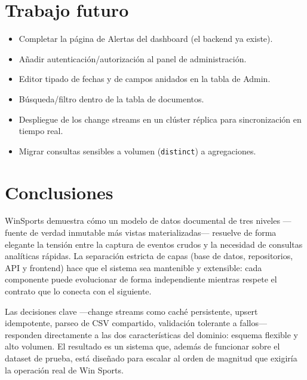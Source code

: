 \documentclass[12pt, letterpaper]{article}
\newcommand{\code}[1]{\texttt{#1}}
\begin{document}
\section{Trabajo futuro}
\begin{itemize}[leftmargin=*]
  \item Completar la página de Alertas del dashboard (el backend ya existe).
  \item Añadir autenticación/autorización al panel de administración.
  \item Editor tipado de fechas y de campos anidados en la tabla de Admin.
  \item Búsqueda/filtro dentro de la tabla de documentos.
  \item Despliegue de los change streams en un clúster réplica para
        sincronización en tiempo real.
  \item Migrar consultas sensibles a volumen (\code{distinct}) a agregaciones.
\end{itemize}

\section{Conclusiones}
WinSports demuestra cómo un modelo de datos documental de tres niveles
—fuente de verdad inmutable más vistas materializadas— resuelve de forma
elegante la tensión entre la captura de eventos crudos y la necesidad de
consultas analíticas rápidas. La separación estricta de capas (base de datos,
repositorios, API y frontend) hace que el sistema sea mantenible y extensible:
cada componente puede evolucionar de forma independiente mientras respete el
contrato que lo conecta con el siguiente.

Las decisiones clave —change streams como caché persistente, upsert idempotente,
parseo de CSV compartido, validación tolerante a fallos— responden directamente
a las dos características del dominio: esquema flexible y alto volumen. El
resultado es un sistema que, además de funcionar sobre el dataset de prueba,
está diseñado para escalar al orden de magnitud que exigiría la operación real
de Win Sports.

\end{document}
